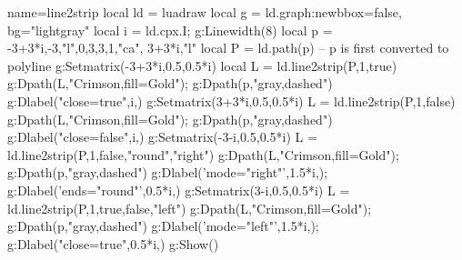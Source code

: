 \begin{luadraw}{name=line2strip}
local ld = luadraw
local g = ld.graph:new{bbox=false, bg="lightgray"}
local i = ld.cpx.I; g:Linewidth(8)
local p = {-3+3*i,-3,"l",0,3,3,1,"ca", 3+3*i,"l"}
local P = ld.path(p)  -- p is first converted to polyline
g:Setmatrix({-3+3*i,0.5,0.5*i})
local L = ld.line2strip(P,1,true)
g:Dpath(L,"Crimson,fill=Gold"); g:Dpath(p,"gray,dashed")
g:Dlabel("close=true",i,{})
g:Setmatrix({3+3*i,0.5,0.5*i})
L = ld.line2strip(P,1,false)
g:Dpath(L,"Crimson,fill=Gold"); g:Dpath(p,"gray,dashed")
g:Dlabel("close=false",i,{})
g:Setmatrix({-3-i,0.5,0.5*i})
L = ld.line2strip(P,1,false,"round","right")
g:Dpath(L,"Crimson,fill=Gold"); g:Dpath(p,"gray,dashed")
g:Dlabel('mode="right"',1.5*i,{}); g:Dlabel('ends="round"',0.5*i,{})
g:Setmatrix({3-i,0.5,0.5*i})
L = ld.line2strip(P,1,true,false,"left")
g:Dpath(L,"Crimson,fill=Gold"); g:Dpath(p,"gray,dashed")
g:Dlabel('mode="left"',1.5*i,{}); g:Dlabel("close=true",0.5*i,{})
g:Show()
\end{luadraw}
